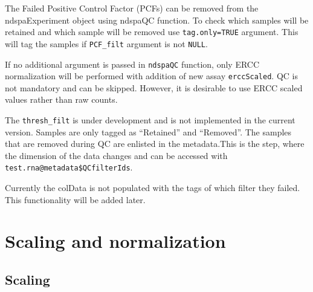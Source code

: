 \documentclass[]{article}
\newcommand{\hlnum}[1]{\textcolor[rgb]{0.816,0.125,0.439}{#1}}%
\newcommand{\hlstr}[1]{\textcolor[rgb]{0.251,0.627,0.251}{#1}}%
\newcommand{\hlcom}[1]{\textcolor[rgb]{0.502,0.502,0.502}{\textit{#1}}}%
\newcommand{\hlstd}[1]{\textcolor[rgb]{0.251,0.251,0.251}{#1}}%
\newenvironment{Shaded}{\begin{myshaded}}{\end{myshaded}}
\newcommand{\ConstantTok}[1]{\hlnum{#1}}
\newcommand{\SpecialCharTok}[1]{\hlstr{#1}}
\newcommand{\CommentTok}[1]{\hlcom{#1}}
\newcommand{\OtherTok}[1]{{#1}}
\newcommand{\FunctionTok}[1]{\hlstd{#1}}
\newcommand{\AttributeTok}[1]{{#1}}
\newcommand{\NormalTok}[1]{\hlstd{#1}}
\begin{document}
The Failed Positive Control Factor (PCFs) can be removed from the
ndspaExperiment object using ndspaQC function. To check which samples will be
retained and which sample will be removed use \texttt{tag.only=TRUE} argument. This
will tag the samples if \texttt{PCF\_filt} argument is not \texttt{NULL}.

If no additional argument is passed in \texttt{ndspaQC} function, only ERCC
normalization will be performed with addition of new assay \texttt{erccScaled}. QC is
not mandatory and can be skipped. However, it is desirable to use ERCC scaled
values rather than raw counts.

\begin{Shaded}
\end{Shaded}

The \texttt{thresh\_filt} is under development and is not implemented in the current
version. Samples are only tagged as ``Retained'' and ``Removed''. The samples that
are removed during QC are enlisted in the metadata.This is the step, where the
dimension of the data changes and can be accessed with
\texttt{test.rna@metadata\$QCfilterIds}.

Currently the colData is not populated with the tags of which filter they
failed. This functionality will be added later.

\hypertarget{scaling-and-normalization}{%
\section{Scaling and normalization}\label{scaling-and-normalization}}

\hypertarget{scaling}{%
\subsection{Scaling}\label{scaling}}
\end{document}
